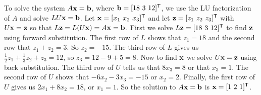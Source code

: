 \begin{example}
	\item  To solve the system $A \mathbf{x} = \mathbf{b}$, where $\mathbf{b} = [18 \ 3 \ 12]^{\mathsf{T}}$, we use the LU factorization of $A$ and solve $LU \mathbf{x} = \mathbf{b}$. Let $\mathbf{x} = [x_1 \ x_2 \ x_3]^{\mathsf{T}}$ and let $\mathbf{z} = [z_1 \ z_2 \ z_3]^{\mathsf{T}}$ with $U \mathbf{x} = \mathbf{z}$ so that $L \mathbf{z} = L(U\mathbf{x}) = A\mathbf{x} = \mathbf{b}$. First we solve $L \mathbf{z} = [18 \ 3 \ 12]^{\mathsf{T}}$ to find $\mathbf{z}$ using forward substitution. The first row of $L$ shows that $z_1 = 18$ and the second row that $z_1 + z_2 = 3$. So $z_2 = -15$. The third row of $L$ gives us $\frac{1}{2}z_1 + \frac{1}{3}z_2 + z_3 = 12$, so $z_3 = 12 - 9 + 5 = 8$. Now to find $\mathbf{x}$ we solve $U \mathbf{x} = \mathbf{z}$ using back substitution. The third row of $U$ tells us that $8x_3 = 8$ or that $x_3 = 1$. The second row of $U$ shows that $-6x_2-3x_3 = -15$ or $x_2 =2$. Finally, the first row of $U$ gives us $2x_1+8x_2 = 18$, or $x_1 = 1$. So the solution to $A \mathbf{x} = \mathbf{b}$ is $\mathbf{x} = [1 \ 2 \ 1]^{\mathsf{T}}$. 
	
	\ea

\end{example}



